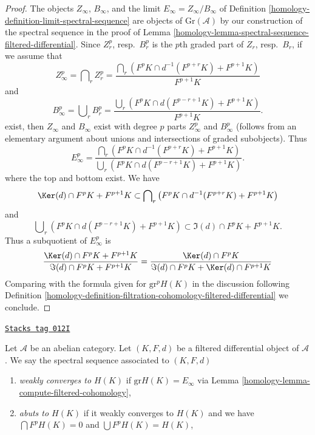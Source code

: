 \begin{proof}

The objects $Z_\infty$, $B_\infty$, and the limit
$E_\infty = Z_\infty/B_\infty$ of
Definition \ref{homology-definition-limit-spectral-sequence}
are objects of $\text{Gr}(\mathcal{A})$ by our construction of
the spectral sequence in the proof of
Lemma \ref{homology-lemma-spectral-sequence-filtered-differential}.
Since $Z_r^p$, resp.\ $B_r^p$ is the $p$th graded part of $Z_r$, resp.\  $B_r$,
if we assume that
$$
Z_\infty^p = \bigcap\nolimits_r Z_r^p =
\frac{\bigcap_r (F^pK \cap d^{-1}(F^{p + r}K) + F^{p + 1}K)}{F^{p + 1}K}
$$
and
$$
B_\infty^p = \bigcup\nolimits_r B_r^p =
\frac{\bigcup_r (F^pK \cap d(F^{p - r + 1}K) + F^{p + 1}K)}{F^{p + 1}K}.
$$
exist, then $Z_\infty$ and $B_\infty$ exist with degree $p$ parts
$Z_\infty^p$ and $B_\infty^p$ (follows from an elementary argument
about unions and intersections of graded subobjects). Thus
$$
E_\infty^p =
\frac{\bigcap_r (F^pK \cap d^{-1}(F^{p + r}K) + F^{p + 1}K)}
{\bigcup_r (F^pK \cap d(F^{p - r + 1}K) + F^{p + 1}K)}.
$$
where the top and bottom exist. We have
\begin{equation}
\label{equation-on-top}
\Ker(d) \cap F^pK + F^{p + 1}K
\subset
\bigcap\nolimits_r \left(F^pK \cap d^{-1}(F^{p + r}K) + F^{p + 1}K\right)
\end{equation}
and
\begin{equation}
\label{equation-at-bottom}
\bigcup\nolimits_r \left(F^pK \cap d(F^{p - r + 1}K) + F^{p + 1}K\right)
\subset
\Im(d) \cap F^pK + F^{p + 1}K.
\end{equation}
Thus a subquotient of $E_\infty^p$ is
$$
\frac{\Ker(d) \cap F^pK + F^{p + 1}K}{\Im(d) \cap F^pK + F^{p + 1}K} =
\frac{\Ker(d) \cap F^pK}{\Im(d) \cap F^pK + \Ker(d) \cap F^{p + 1}K}
$$
Comparing with the formula given for $\text{gr}^pH(K)$ in the discussion
following
Definition \ref{homology-definition-filtration-cohomology-filtered-differential}
we conclude.
\end{proof}

\begin{definition}
\label{homology-definition-filtered-differential-ss-converges}
\href{https://stacks.math.columbia.edu/tag/012I}{\texttt{Stacks tag 012I}}

Let $\mathcal{A}$ be an abelian category.
Let $(K, F, d)$ be a filtered differential object of $\mathcal{A}$.
We say the spectral sequence associated to $(K, F, d)$
\begin{enumerate}
\item {\it weakly converges to $H(K)$} if $\text{gr}H(K) = E_{\infty}$
via Lemma \ref{homology-lemma-compute-filtered-cohomology},
\item {\it abuts to $H(K)$} if it weakly converges to $H(K)$ and
we have $\bigcap F^pH(K) = 0$ and $\bigcup F^pH(K) = H(K)$,
\end{enumerate}
\end{definition}

